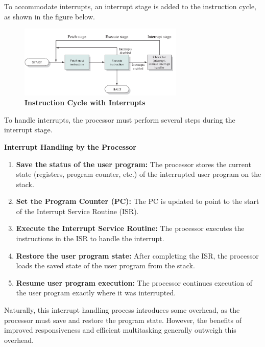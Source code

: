 \documentclass{article}
\begin{document}
To accommodate interrupts, an interrupt stage is added to the instruction cycle, as shown in the figure below.
\begin{figure}[!h]
    \centering
    \includegraphics[width=0.7\textwidth]{figures/Ch01Figure5.png} %
    \caption{\textbf{Instruction Cycle with Interrupts}}
    \label{fig:Ch01Fig5}
\end{figure}

To handle interrupts, the processor must perform several steps during the interrupt stage.
\begin{methodbox}
\textbf{Interrupt Handling by the Processor}

\begin{enumerate}
    \item \textbf{Save the status of the user program:} The processor stores the current state (registers, program counter, etc.) of the interrupted user program on the stack.
    \item \textbf{Set the Program Counter (PC):} The PC is updated to point to the start of the Interrupt Service Routine (ISR).
    \item \textbf{Execute the Interrupt Service Routine:} The processor executes the instructions in the ISR to handle the interrupt.
    \item \textbf{Restore the user program state:} After completing the ISR, the processor loads the saved state of the user program from the stack.
    \item \textbf{Resume user program execution:} The processor continues execution of the user program exactly where it was interrupted.
\end{enumerate}

\end{methodbox}

Naturally, this interrupt handling process introduces some overhead, as the processor must save and restore the program state.
However, the benefits of improved responsiveness and efficient multitasking generally outweigh this overhead.

\newpage
\end{document}
